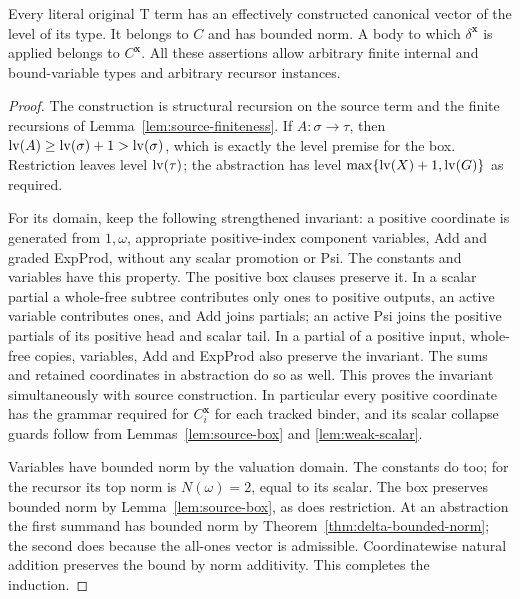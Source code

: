 \begin{proposition}
\label{prop:canonical-domain}
Every literal original T term has an effectively constructed canonical
vector of the level of its type.  It belongs to $C$ and has bounded
norm.  A body to which $\delta^{\mathbf x}$ is applied belongs
to $C^{\mathbf x}$.  All these assertions allow arbitrary finite
internal and bound-variable types and arbitrary recursor instances.
\end{proposition}
\begin{proof}
The construction is structural recursion on the source term and the
finite recursions of Lemma~\ref{lem:source-finiteness}.  If
$A:\sigma\to\tau$, then
$\operatorname{lv}(A)\ge\operatorname{lv}(\sigma)+1>\operatorname{lv}(\sigma)$, which is exactly the
level premise for the box.  Restriction leaves level $\operatorname{lv}(\tau)$;
the abstraction has level $\max\{\operatorname{lv}(X)+1,\operatorname{lv}(G)\}$ as required.

For its domain, keep the following strengthened invariant: a positive
coordinate is generated from $1,\omega$, appropriate positive-index
component variables, Add and graded ExpProd, without any scalar
promotion or Psi.  The constants and variables have this property.
The positive box clauses preserve it.  In a scalar partial a whole-free
subtree contributes only ones to positive outputs, an active variable
contributes ones, and Add joins partials; an active Psi joins the
positive partials of its positive head and scalar tail.  In a partial
of a positive input, whole-free copies, variables, Add and ExpProd
also preserve the invariant.  The sums and retained coordinates in
abstraction do so as well.  This proves the invariant simultaneously
with source construction.  In particular every positive coordinate
has the grammar required for $C_i^{\mathbf x}$ for each tracked
binder, and its scalar collapse guards follow from
Lemmas~\ref{lem:source-box} and \ref{lem:weak-scalar}.

Variables have bounded norm by the valuation domain.  The constants
do too; for the recursor its top norm is $N(\omega)=2$, equal to
its scalar.  The box preserves bounded norm by
Lemma~\ref{lem:source-box}, as does restriction.  At an abstraction
the first summand has bounded norm by
Theorem~\ref{thm:delta-bounded-norm}; the second does because the
all-ones vector is admissible.  Coordinatewise natural addition
preserves the bound by norm additivity.  This completes the induction.
\end{proof}

